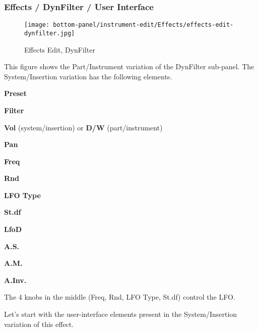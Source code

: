 \subsubsection{Effects / DynFilter / User Interface}
\label{subsubsec:effects_edit_dynfilter_ui}

%

\begin{figure}[H]
   \centering 
   \texttt{[image: bottom-panel/instrument-edit/Effects/effects-edit-dynfilter.jpg]}
   \caption{Effects Edit, DynFilter}
   \label{fig:effects_edit_dynfilter}
\end{figure}

   This figure shows the Part/Instrument variation of the DynFilter sub-panel.
   The System/Insertion variation has the following elements.

   \begin{enumber}
      \item \textbf{Preset}
      \item \textbf{Filter}
      \item \textbf{Vol} (system/insertion) or \textbf{D/W} (part/instrument)
      \item \textbf{Pan}
      \item \textbf{Freq}
      \item \textbf{Rnd}
      \item \textbf{LFO Type}
      \item \textbf{St.df}
      \item \textbf{LfoD}
      \item \textbf{A.S.}
      \item \textbf{A.M.}
      \item \textbf{A.Inv.}
   \end{enumber}

   The 4 knobs in the middle (Freq, Rnd, LFO Type, St.df) control the LFO.

   Let's start with the user-interface elements present in the
   System/Insertion variation of this effect.

   \setcounter{ItemCounter}{0}      %

